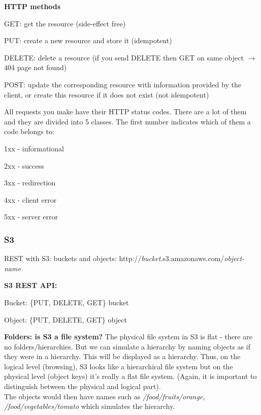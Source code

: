 \documentclass[11pt,oneside,a4paper]{article}
\begin{document}
\textbf{HTTP methods}

\begin{compactitem}
	\item GET: get the resource (side-effect free)
	\item PUT: create a new resource and store it (idempotent)
	\item DELETE: delete a resource (if you send DELETE then GET on same object $\rightarrow$ 404 page not found)
	\item POST: update the corresponding resource with information provided by the client, or create this resource if it does not exist (not idempotent)\\
\end{compactitem}

All requests you make have their HTTP status codes. There are a lot of them and they are divided into 5 classes. The first number indicates which of them a code belongs to:

\begin{compactitem}
	\item 1xx - informational
	\item 2xx - success
	\item 3xx - redirection
	\item 4xx - client error
	\item 5xx - server error
\end{compactitem}


\subsubsection{S3}

REST with S3: buckets and objects: http://\textit{bucket}.s3.amazonaws.com/\textit{object-name}

\textbf{S3 REST API:}

\begin{compactitem}
	\item Bucket: \{PUT, DELETE, GET\} bucket
	\item Object: \{PUT, DELETE, GET\} object\\
\end{compactitem}

\textbf{Folders: is S3 a file system?}
The physical file system in S3 is flat - there are no folders/hierarchies. But we can simulate a hierarchy by naming objects as if they were in a hierarchy. This will be displayed as a hierarchy. Thus, on the logical level (browsing), S3 looks like a hierarchical file system but on the physical level (object keys) it's really a flat file system. (Again, it is important to distinguish between the physical and logical part).\\
The objects would then have names such as \textit{/food/fruits/orange, /food/vegetables/tomato} which simulates the hierarchy.
\end{document}

